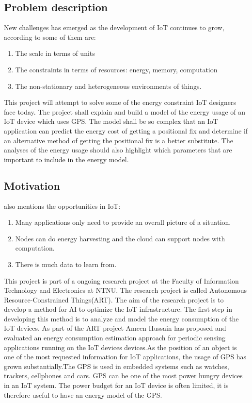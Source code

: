 \subsection{Problem description}
New challenges has emerged as the development of IoT continues to grow, according to \cite{frank} some of them are:

\begin{enumerate}
    \item The scale in terms of units
    \item The constraints in terms of resources: energy, memory, computation
    \item The non-stationary and heterogeneous environments of things.
    
\end{enumerate}

This project will attempt to solve some of the energy constraint IoT designers face today. The project shall explain and build a model of the energy usage of an IoT device which uses GPS. The model shall be so complex that an IoT application can predict the energy cost of getting a positional fix and determine if an alternative method of getting the positional fix is a better substitute. The analyses of the energy usage should also highlight which parameters that are important to include in the energy model. %
\\
\subsection{Motivation}
\cite{frank} also mentions the opportunities in IoT: 
\begin{enumerate}
    \item Many applications only need to provide an overall picture of a situation.
    \item Nodes can	do energy harvesting and the cloud can support nodes with computation.
    \item There	is much data to learn from.
    
\end{enumerate}
This project is part of a ongoing research project at the Faculty of Information Technology and Electronics at NTNU. The research project is called Autonomous Resource-Constrained Things(ART). The aim of the research project is to develop a method for AI to optimize the IoT infrastructure. The first step in developing this method is to analyze and model the energy consumption of the IoT devices. As part of the ART project Ameen Hussain has proposed and evaluated an energy consumption estimation approach for periodic sensing applications running on the IoT devices
devices\cite{Amen}.As the position of an object is one of the most requested information for IoT applications, the usage of GPS has grown substantially.The GPS is used in embedded systems such as watches, trackers, cellphones and cars. GPS can be one of the most power hungry devices in an IoT system. The power budget for an IoT device is often limited, it is therefore useful to have an energy model of the GPS.\\

